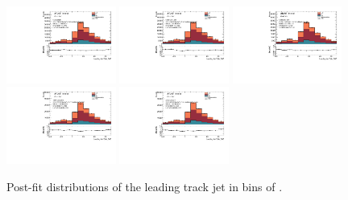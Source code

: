 \begin{figure}[htbp]
  \centering
 \includegraphics[width=0.32\textwidth]{figures/gbb/Sub_Sd0_Fits/Canv_Fit_0-Deltaphi-0628_LpT_INF_SpT_INF_coarse_x.pdf}
 \includegraphics[width=0.32\textwidth]{figures/gbb/Sub_Sd0_Fits/Canv_Fit_0628-Deltaphi-1256_LpT_INF_SpT_INF_coarse_x.pdf}
 \includegraphics[width=0.32\textwidth]{figures/gbb/Sub_Sd0_Fits/Canv_Fit_1256-Deltaphi-1884_LpT_INF_SpT_INF_coarse_x.pdf}\\
 \includegraphics[width=0.32\textwidth]{figures/gbb/Sub_Sd0_Fits/Canv_Fit_1884-Deltaphi-2512_LpT_INF_SpT_INF_coarse_x.pdf}
 \includegraphics[width=0.32\textwidth]{figures/gbb/Sub_Sd0_Fits/Canv_Fit_2512-Deltaphi-3140_LpT_INF_SpT_INF_coarse_x.pdf}


\caption{Post-fit \subsdzero distributions of the leading track jet in bins of \dphi. }
  \label{fig:dphi-postfits-leading}
\end{figure}



